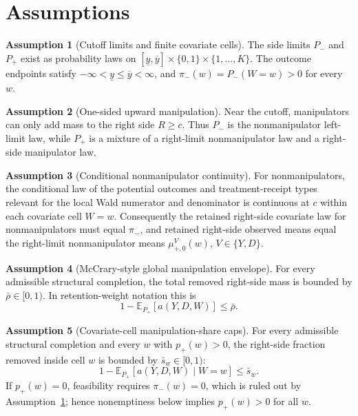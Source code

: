 \documentclass[11pt]{article}
\newcommand{\E}{\mathbb{E}}
\theoremstyle{definition}
\newtheorem{assumption}{Assumption}
\theoremstyle{plain}
\theoremstyle{remark}
\begin{document}
\section{Assumptions}
\begin{assumption}[Cutoff limits and finite covariate cells]\label{ass:cutoff-limits}
The side limits \(P_-\) and \(P_+\) exist as probability laws on
\([\underline y,\overline y]\times\{0,1\}\times\{1,\ldots,K\}\).  The outcome endpoints
satisfy \(-\infty<\underline y\le\overline y<\infty\), and
\(\pi_-(w)=P_-(W=w)>0\) for every \(w\).
\end{assumption}

\begin{assumption}[One-sided upward manipulation]\label{ass:one-sided}
Near the cutoff, manipulators can only add mass to the right side \(R\ge c\).  Thus
\(P_-\) is the nonmanipulator left-limit law, while \(P_+\) is a mixture of a
right-limit nonmanipulator law and a right-side manipulator law.
\end{assumption}

\begin{assumption}[Conditional nonmanipulator continuity]\label{ass:conditional-continuity}
For nonmanipulators, the conditional law of the potential outcomes and treatment-receipt
types relevant for the local Wald numerator and denominator is continuous at \(c\) within
each covariate cell \(W=w\).  Consequently the retained right-side covariate law for
nonmanipulators must equal \(\pi_-\), and retained right-side observed means equal the
right-limit nonmanipulator means \(\mu^V_{+,0}(w)\), \(V\in\{Y,D\}\).
\end{assumption}

\begin{assumption}[McCrary-style global manipulation envelope]\label{ass:global-envelope}
For every admissible structural completion, the total removed right-side mass is bounded
by \(\bar\rho\in[0,1)\).  In retention-weight notation this is
\[
  1-\E_{P_+}[a(Y,D,W)]\le\bar\rho .
\]
\end{assumption}

\begin{assumption}[Covariate-cell manipulation-share caps]\label{ass:cell-caps}
For every admissible structural completion and every \(w\) with \(p_+(w)>0\), the
right-side fraction removed inside cell \(w\) is bounded by \(\bar s_w\in[0,1)\):
\[
  1-\E_{P_+}[a(Y,D,W)\mid W=w]\le\bar s_w .
\]
If \(p_+(w)=0\), feasibility requires \(\pi_-(w)=0\), which is ruled out by
Assumption~\ref{ass:cutoff-limits}; hence nonemptiness below implies \(p_+(w)>0\) for
all \(w\).
\end{assumption}
\end{document}
